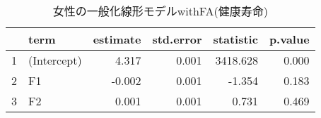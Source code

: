 \begin{table}[H]
\centering
\begingroup\tiny
\begin{tabular}{rlrrrr}
  \hline
 & term & estimate & std.error & statistic & p.value \\ 
  \hline
1 & (Intercept) & 4.317 & 0.001 & 3418.628 & 0.000 \\ 
  2 & F1 & -0.002 & 0.001 & -1.354 & 0.183 \\ 
  3 & F2 & 0.001 & 0.001 & 0.731 & 0.469 \\ 
   \hline
\end{tabular}
\endgroup
\caption{女性の一般化線形モデルwithFA(健康寿命)} 
\label{table_Gamma_HLE_FA_f}
\end{table}
